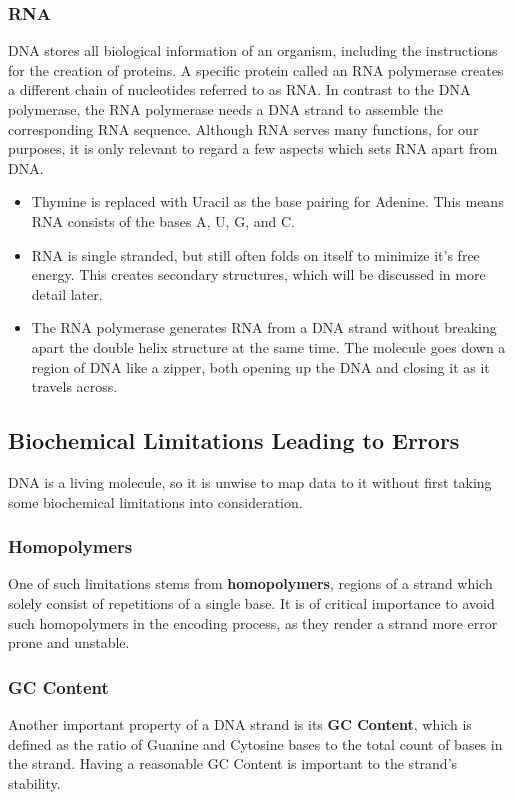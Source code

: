 \documentclass[a4paper,conference]{IEEEtran}
\begin{document}
\subsubsection{RNA}

DNA stores all biological information of an organism, including the instructions for the creation of proteins. A specific protein called an RNA polymerase creates a different chain of nucleotides referred to as RNA. In contrast to the DNA polymerase, the RNA polymerase needs a DNA strand to assemble the corresponding RNA sequence. Although RNA serves many functions, for our purposes, it is only relevant to regard a few aspects which sets RNA apart from DNA.

\begin{itemize}
    \item Thymine is replaced with Uracil as the base pairing for Adenine. This means RNA consists of the bases A, U, G, and C.
    \item RNA is single stranded, but still often folds on itself to minimize it's free energy. This creates secondary structures, which will be discussed in more detail later.
    \item The RNA polymerase generates RNA from a DNA strand without breaking apart the double helix structure at the same time. The molecule goes down a region of DNA like a zipper, both opening up the DNA and closing it as it travels across.
\end{itemize}

\subsection{Biochemical Limitations Leading to Errors}
DNA is a living molecule, so it is unwise to map data to it without first taking some biochemical limitations into consideration.

\subsubsection{Homopolymers}
One of such limitations stems from \textbf{homopolymers}, regions of a strand which solely consist of repetitions of a single base. It is of critical importance to avoid such homopolymers in the encoding process, as they render a strand more error prone \cite{?} and unstable.

\subsubsection{GC Content}
Another important property of a DNA strand is its \textbf{GC Content}, which is defined as the ratio of Guanine and Cytosine bases to the total count of bases in the strand. Having a reasonable GC Content \cite{?} is important to the strand's stability. 
\end{document}
